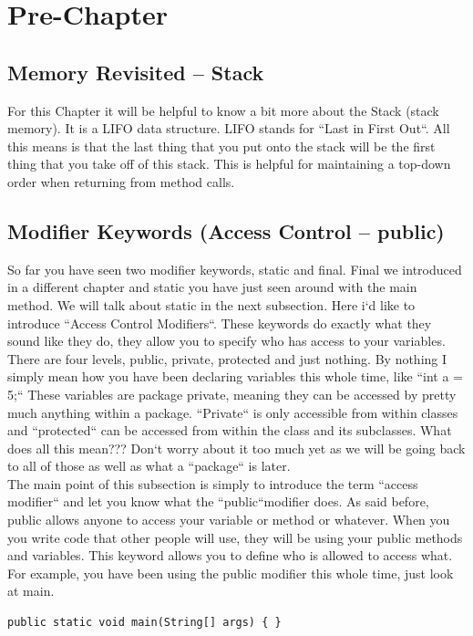 \documentclass[11]{article}
\begin{document}
\section{Pre-Chapter}
\subsection{Memory Revisited -- Stack}
For this Chapter it will be helpful to know a bit more about the Stack (stack memory). It is a LIFO data structure. LIFO stands for ``Last in First Out``. All this means is that the last thing that you put onto the stack will be the first thing that you take off of this stack. This is helpful for maintaining a top-down order when returning from method calls. 

\subsection{Modifier Keywords (Access Control -- public)}
\label{sec:mods}
So far you have seen two modifier keywords, static and final. Final we introduced in a different chapter and static you have just seen around with the main method. We will talk about static in the next subsection. Here i`d like to introduce ``Access Control Modifiers``. These keywords do exactly what they sound like they do, they allow you to specify who has access to your variables. There are four levels, public, private, protected and just nothing. By nothing I simply mean how you have been declaring variables this whole time, like ``int a = 5;`` These variables are package private, meaning they can be accessed by pretty much anything within a package. ``Private`` is only accessible from within classes and ``protected`` can be accessed from within the class and its subclasses. What does all this mean??? Don`t worry about it too much yet as we will be going back to all of those as well as what a ``package`` is later.\\

The main point of this subsection is simply to introduce the term ``access modifier`` and let you know what the ``public``modifier does. As said before, public allows anyone to access your variable or method or whatever. When you you write code that other people will use, they will be using your public methods and variables. This keyword allows you to define who is allowed to access what.\\

For example, you have been using the public modifier this whole time, just look at main.
\begin{lstlisting}
public static void main(String[] args) { }
\end{lstlisting} 
\end{document}
